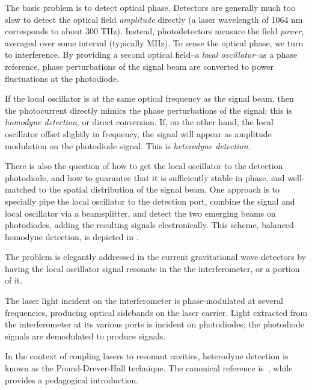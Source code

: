 \label{chapter3}
\doublespace
{}

The basic problem is to detect optical phase.  Detectors are generally
much too slow to detect the optical field \emph{amplitude} directly (a
laser wavelength of 1064 nm corresponds to about 300 THz).  Instead,
photodetectors measure the field \emph{power}, averaged over some
interval (typically MHz).  To sense the optical phase, we turn to
interference.  By providing a second optical field--a \emph{local
  oscillator}--as a phase reference, phase perturbations of the signal
beam are converted to power fluctuations at the photodiode.  

If the local oscillator is at the same optical frequency as the signal
beam, then the photocurrent directly mimics the phase perturbations of
the signal; this is \emph{homodyne detection}, or direct conversion.
If, on the other hand, the local oscillator offset slightly in
frequency, the signal will appear as amplitude modulation on the
photodiode signal.  This is \emph{heterodyne detection}.

There is also the question of how to get the local oscillator to the
detection photodiode, and how to guarantee that it is sufficiently
stable in phase, and well-matched to the spatial distribution of the
signal beam.  One approach is to specially pipe the local oscillator
to the detection port, combine the signal and local oscillator via a
beamsplitter, and detect the two emerging beams on photodiodes, adding
the resulting signals electronically.  This scheme, balanced homodyne
detection, is depicted in .

The problem is elegantly addressed in the current gravitational wave
detectors by having the local oscillator signal resonate in the the
interferometer, or a portion of it.


The laser light incident on the interferometer is phase-modulated at
several frequencies, producing optical sidebands on the laser carrier.
Light extracted from the interferometer at its various ports is
incident on photodiodes; the photodiode signals are demodulated to
produce signals.


In the context of coupling lasers to resonant cavities, heterodyne
detection is known as the Pound-Drever-Hall technique.  The canonical
reference is~\cite{Drever1983Laser}, while
\cite{Black2001Introduction} provides a pedagogical introduction.

